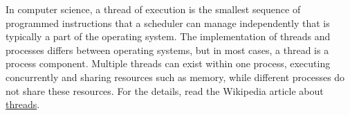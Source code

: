In computer science, a thread of execution is the smallest sequence of programmed instructions that a scheduler can manage independently that is typically a part of the operating system. The implementation of threads and processes differs between operating systems, but in most cases, a thread is a process component. Multiple threads can exist within one process, executing concurrently and sharing resources such as memory, while different processes do not share these resources. For the details, read the Wikipedia article about \href{https://en.wikipedia.org/wiki/Thread_(computing)}{threads}.